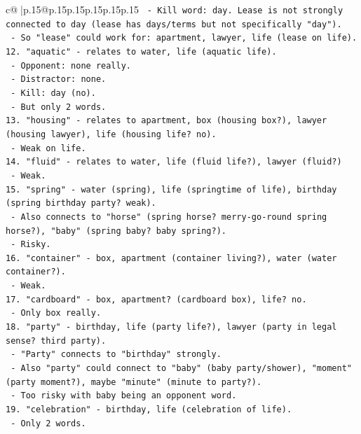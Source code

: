 \documentclass{article}
\begin{document}
{\begin{supertabular}{c@{$\;$}|p{.15\linewidth}@{}p{.15\linewidth}p{.15\linewidth}p{.15\linewidth}p{.15\linewidth}p{.15\linewidth}}
{{{\texttt{    {-} Kill word: day. Lease is not strongly connected to day (lease has days/terms but not specifically "day").} \\
\texttt{    {-} So "lease" could work for: apartment, lawyer, life (lease on life).} \\
\texttt{12. "aquatic" {-} relates to water, life (aquatic life).} \\
\texttt{    {-} Opponent: none really.} \\
\texttt{    {-} Distractor: none.} \\
\texttt{    {-} Kill: day (no).} \\
\texttt{    {-} But only 2 words.} \\
\texttt{13. "housing" {-} relates to apartment, box (housing box?), lawyer (housing lawyer), life (housing life? no).} \\
\texttt{    {-} Weak on life.} \\
\texttt{14. "fluid" {-} relates to water, life (fluid life?), lawyer (fluid?)} \\
\texttt{    {-} Weak.} \\
\texttt{15. "spring" {-} water (spring), life (springtime of life), birthday (spring birthday party? weak).} \\
\texttt{    {-} Also connects to "horse" (spring horse? merry{-}go{-}round spring horse?), "baby" (spring baby? baby spring?).} \\
\texttt{    {-} Risky.} \\
\texttt{16. "container" {-} box, apartment (container living?), water (water container?).} \\
\texttt{    {-} Weak.} \\
\texttt{17. "cardboard" {-} box, apartment? (cardboard box), life? no.} \\
\texttt{    {-} Only box really.} \\
\texttt{18. "party" {-} birthday, life (party life?), lawyer (party in legal sense? third party).} \\
\texttt{    {-} "Party" connects to "birthday" strongly.} \\
\texttt{    {-} Also "party" could connect to "baby" (baby party/shower), "moment" (party moment?), maybe "minute" (minute to party?).} \\
\texttt{    {-} Too risky with baby being an opponent word.} \\
\texttt{19. "celebration" {-} birthday, life (celebration of life).} \\
\texttt{    {-} Only 2 words.} \\
}}}
\end{supertabular}}
\end{document}
